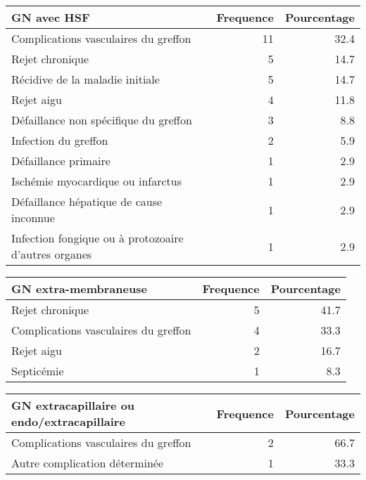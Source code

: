 \documentclass[11pt,a4paper]{article}\usepackage[]{graphicx}\usepackage[]{color}
\begin{document}
\begin{table}[H]
\centering
\begin{tabular}{lrr}
  \hline
GN avec HSF & Frequence & Pourcentage \\ 
  \hline
Complications vasculaires du greffon & 11 & 32.4 \\ 
  Rejet chronique & 5 & 14.7 \\ 
  Récidive de la maladie initiale & 5 & 14.7 \\ 
  Rejet aigu & 4 & 11.8 \\ 
  Défaillance non spécifique du greffon & 3 & 8.8 \\ 
  Infection du greffon & 2 & 5.9 \\ 
  Défaillance primaire & 1 & 2.9 \\ 
  Ischémie myocardique ou infarctus & 1 & 2.9 \\ 
  Défaillance hépatique de cause inconnue & 1 & 2.9 \\ 
  Infection fongique ou à protozoaire d'autres organes & 1 & 2.9 \\ 
   \hline
\end{tabular}
\end{table}
\begin{table}[H]
\centering
\begin{tabular}{lrr}
  \hline
GN extra-membraneuse & Frequence & Pourcentage \\ 
  \hline
Rejet chronique & 5 & 41.7 \\ 
  Complications vasculaires du greffon & 4 & 33.3 \\ 
  Rejet aigu & 2 & 16.7 \\ 
  Septicémie & 1 & 8.3 \\ 
   \hline
\end{tabular}
\end{table}
\begin{table}[H]
\centering
\begin{tabular}{lrr}
  \hline
GN extracapillaire ou endo/extracapillaire & Frequence & Pourcentage \\ 
  \hline
Complications vasculaires du greffon & 2 & 66.7 \\ 
  Autre complication déterminée & 1 & 33.3 \\ 
   \hline
\end{tabular}
\end{table}
\end{document}
